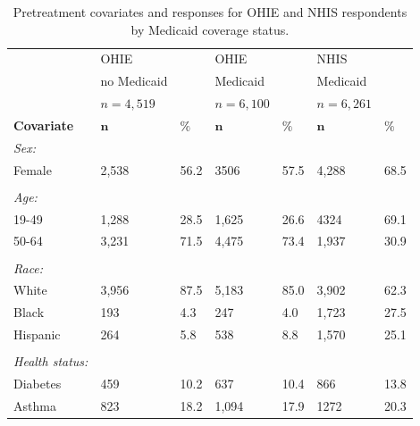 \documentclass[hidelinks,12pt]{article}
\begin{document}
\begin{appendices}
\begin{singlespace}
	\begin{longtable}{lllllll}
		\caption{Pretreatment covariates and responses for OHIE and NHIS respondents by Medicaid coverage status.\label{rct-nrt-compare}} \\
		& OHIE &  & OHIE &  & NHIS &  \\ 
		& no Medicaid &  & Medicaid &  &Medicaid &   \\ 
		& $n=4,519$ &  & $n=6,100$ &  & $n=6,261$ &  \\  
		\hline   
		\hline   
		\textbf{Covariate} &  $\mathbf{n}$ & $\mathbf{\%}$ & $\mathbf{n}$ & $\mathbf{\%}$ & $\mathbf{n}$ & $\mathbf{\%}$ \\ 
		\hline
		\textit{Sex:} &  & & &  &  & \\ 
		
		\hspace{3mm} Female & 2,538 & 56.2 & 3506 & 57.5 & 4,288 & 68.5 \\ 
		&  & & &  &  & \\ 
		\textit{Age:} &  & & &  &  & \\ 
		\hspace{3mm}19-49 & 1,288 & 28.5 & 1,625 & 26.6 & 4324 & 69.1  \\ 
		
		\hspace{3mm}50-64 & 3,231 & 71.5 & 4,475 & 73.4 & 1,937 & 30.9 \\ 
		&  & & &  &  & \\ 
		\textit{Race:} &  & & &  &  & \\ 
		\hspace{3mm}White & 3,956 & 87.5 & 5,183 & 85.0 & 3,902 & 62.3  \\ 
		
		\hspace{3mm}Black & 193 & 4.3 & 247 & 4.0 & 1,723 & 27.5  \\ 
		
		\hspace{3mm}Hispanic &  264 & 5.8 & 538 & 8.8 & 1,570 & 25.1  \\ 
		&  & & &  &  & \\ 
		\textit{Health status:} &  & & &  &  & \\ 
		\hspace{3mm}Diabetes & 459 & 10.2 & 637 & 10.4 & 866 & 13.8  \\ 
		
		\hspace{3mm}Asthma & 823 & 18.2 & 1,094 & 17.9 & 1272 & 20.3   \\ 
		

\end{longtable}
\end{singlespace}
\end{appendices}
\end{document}
